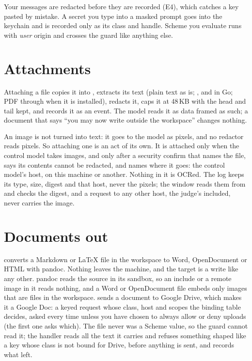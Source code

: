 Your messages are redacted before they are recorded (E4), which catches a
key pasted by mistake. A secret you type into a masked prompt goes into the
keychain and is recorded only as its class and handle. Scheme you evaluate
runs with \emph{user} origin and crosses the guard like anything else.

\section{Attachments}

Attaching a file copies it into , extracts its
text (plain text as is; ,  and  in Go;
PDF through  when it is installed), redacts it, caps it at
48\,KB with the head and tail kept, and records it as an 
event. The model reads it as data framed as such; a document that says
``you may now write outside the workspace'' changes nothing.

An image is not turned into text: it goes to the model as pixels, and no
redactor reads pixels. So attaching one is an act of its own. It is attached
only when the control model takes images, and only after a security confirm
that names the file, says its contents cannot be redacted, and names where
it goes: the control model's host, on this machine or another. Nothing in
it is OCRed. The log keeps its type, size, digest and that host, never the
pixels; the window reads them from  and checks
the digest, and a request to any other host, the judge's included, never
carries the image.

\section{Documents out}

 converts a Markdown or LaTeX file in the workspace to
Word, OpenDocument or HTML with pandoc. Nothing leaves the machine, and the
target is a write like any other. pandoc reads the source in its sandbox,
so an include or a remote image in it reads nothing, and a Word or
OpenDocument file embeds only images that are files in the workspace.
 sends a document to Google Drive, which makes it a
Google Doc: a keyed request whose class, host and scopes the binding table
decides, asked every time unless you have chosen to always allow or deny
uploads (the first one asks which). The file never was a Scheme value, so the guard
cannot read it; the handler reads all the text it carries and refuses
something shaped like a key whose class is not bound for Drive, before
anything is sent, and  records what left.

